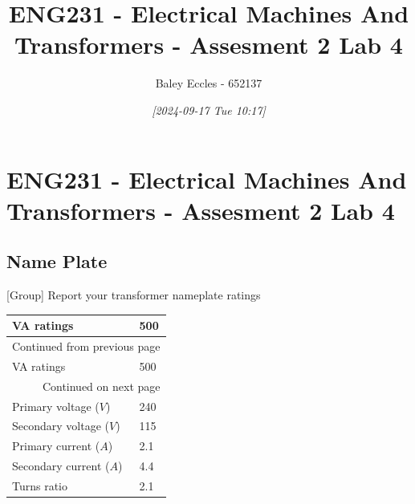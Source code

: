 \documentclass[11pt]{article}
\author{Baley Eccles - 652137}
\date{\textit{{[}2024-09-17 Tue 10:17]}}
\title{ENG231 - Electrical Machines And Transformers - Assesment 2 Lab 4}
\begin{document}
\maketitle
\tableofcontents

\section{ENG231 - Electrical Machines And Transformers - Assesment 2 Lab 4}
\label{sec:orgce43c33}
\subsection{Name Plate}
\label{sec:org780c98c}
{[}Group] Report your transformer nameplate ratings
\begin{longtable}{|l|l|}
\hline
VA ratings & 500\\
\hline
\endfirsthead
\multicolumn{2}{l}{Continued from previous page} \\
\hline

VA ratings & 500 \\

\hline
\endhead
\hline\multicolumn{2}{r}{Continued on next page} \\
\endfoot
\endlastfoot
\hline
Primary voltage (\(V\)) & 240\\
\hline
Secondary voltage (\(V\)) & 115\\
\hline
Primary current (\(A\)) & 2.1\\
\hline
Secondary current (\(A\)) & 4.4\\
\hline
Turns ratio & 2.1\\
\hline
\end{longtable}
\end{document}

